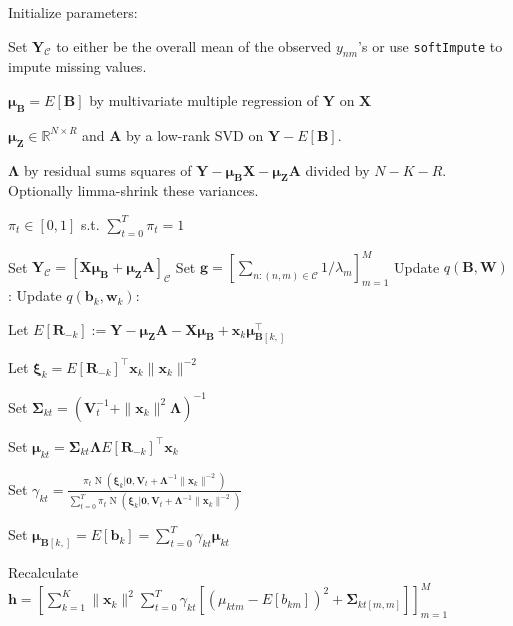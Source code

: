 \documentclass[11pt,authoryear]{article}
\DeclareMathOperator*{\N}{N}
\newcommand{\bs}[1]{\boldsymbol{#1}}
\begin{document}
\begin{algorithm}
\begin{algorithmic}
  \STATE Initialize parameters:
  \begin{description}
  \item Set $\bs{Y}_{\mathcal{C}}$ to either be the overall mean of the observed $y_{nm}$'s or use \texttt{softImpute} to impute missing values.
  \item $\bs{\mu}_{\bs{B}} = E[\bs{B}]$ by multivariate multiple regression of $\bs{Y}$ on $\bs{X}$
  \item $\bs{\mu}_{\bs{Z}} \in \mathbb{R}^{N \times R}$ and $\bs{A}$ by a low-rank SVD on $\bs{Y} - E[\bs{B}]$.
  \item $\bs{\Lambda}$ by residual sums squares of $\bs{Y} - \bs{\mu}_{\bs{B}}\bs{X} - \bs{\mu}_{\bs{Z}}\bs{A}$ divided by $N - K - R$. Optionally limma-shrink these variances.
  \item $\pi_t \in [0, 1]$ s.t. $\sum_{t = 0}^T\pi_t = 1$
  \end{description}
  \STATE Set $\bs{Y}_{\mathcal{C}} = \left[\bs{X}\bs{\mu}_{\bs{B}} + \bs{\mu}_{\bs{Z}}\bs{A}\right]_{\mathcal{C}}$
  \STATE Set $\bs{g} = \left[\sum_{n: (n, m) \in \mathcal{C}} 1 / \lambda_m\right]_{m = 1}^M$
  \REPEAT
  \STATE Update $q(\bs{B},\bs{W})$:
  \STATE Update $q(\bs{b}_k,\bs{w}_k)$:
  \begin{description}
  \item Let $E[\bs{R}_{-k}] := \bs{Y} - \bs{\mu}_{\bs{Z}}\bs{A} - \bs{X}\bs{\mu}_{\bs{B}} + \bs{x}_k\bs{\mu}_{\bs{B}[k, ]}^{\intercal}$
  \item Let $\bs{\xi}_k = E\left[\bs{R}_{-k}\right]^{\intercal}\bs{x}_k\|\bs{x}_k\|^{-2}$
  \item Set $\bs{\Sigma}_{kt} = \left(\bs{V}_t^{-1} + \|\bs{x}_k\|^2\bs{\Lambda}\right)^{-1}$
  \item Set $\bs{\mu}_{kt} = \bs{\Sigma}_{kt}\bs{\Lambda}E\left[\bs{R}_{-k}\right]^{\intercal}\bs{x}_k$
  \item Set $\gamma_{kt} = \frac{\pi_t\N(\bs{\xi}_k|\bs{0}, \bs{V}_t + \bs{\Lambda}^{-1}\|\bs{x}_k\|^{-2})}{\sum_{t = 0}^T\pi_t\N(\bs{\xi}_k|\bs{0}, \bs{V}_t + \bs{\Lambda}^{-1}\|\bs{x}_k\|^{-2})}$
    \ENDFOR
  \item Set $\bs{\mu}_{\bs{B}[k, ]} = E[\bs{b}_{k}] = \sum_{t = 0}^T \gamma_{kt}\bs{\mu}_{kt}$
  \end{description}
  \ENDFOR
  \STATE Recalculate $\bs{h} = \left[\sum_{k = 1}^K\|\bs{x}_k\|^2\sum_{t = 0}^T\gamma_{kt}\left[\left(\mu_{ktm} - E[b_{km}]\right)^2 + \bs{\Sigma}_{kt[m, m]}\right]\right]_{m = 1}^{M}$

\end{algorithmic}
\end{algorithm}
\end{document}

